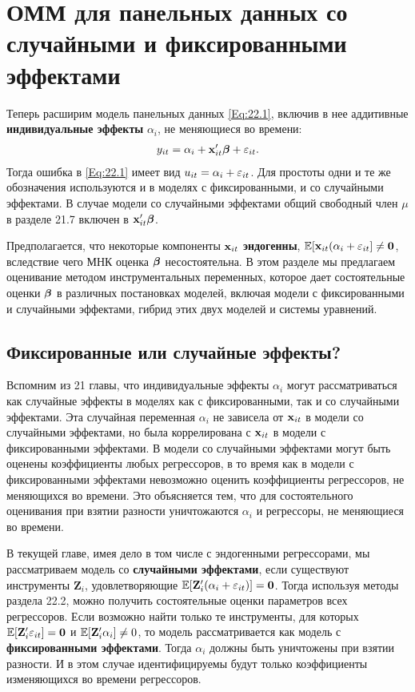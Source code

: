 \section{ОММ для панельных данных со случайными и фиксированными эффектами}

Теперь расширим модель панельных данных \ref{Eq:22.1}, включив в нее аддитивные \textbf{индивидуальные эффекты} $\alpha_i$, не меняющиеся во времени:
\begin{align}
y_{it}=\alpha_i+\mathbf{x}'_{it}\bm{\beta} + \varepsilon_{it}.
\label{Eq:22.23}
\end{align}
Тогда ошибка в \ref{Eq:22.1} имеет вид $u_{it}=\alpha_i +\varepsilon_{it}$. Для простоты одни и те же  обозначения используются и в моделях с фиксированными, и со случайными эффектами. В случае модели со случайными эффектами общий свободный член $\mu$ в разделе 21.7 включен в $\mathbf{x}'_{it} \bm{\beta}$.

Предполагается, что некоторые компоненты $\mathbf{x}_{it}$ \textbf{эндогенны}, $\mathbb{E}[\mathbf{x}_{it}(\alpha_i+\varepsilon_{it}] \neq \mathbf 0$, вследствие чего МНК оценка $\bm{\beta}$ несостоятельна. В этом разделе мы предлагаем оценивание методом инструментальных переменных, которое дает состоятельные оценки $\bm{\beta}$ в различных постановках моделей, включая модели с фиксированными и случайными эффектами, гибрид этих двух моделей и системы уравнений.

\subsection{Фиксированные или случайные эффекты?}

Вспомним из 21 главы, что индивидуальные эффекты $\alpha_i$ могут рассматриваться как случайные эффекты в моделях как с фиксированными, так и со случайными эффектами. Эта случайная переменная $\alpha_i$ не зависела от $\mathbf{x}_{it}$ в модели со случайными эффектами, но была коррелирована  с $\mathbf{x}_{it}$ в модели с фиксированными эффектами. В модели со случайными эффектами могут быть оценены коэффициенты любых регрессоров, в то время как в модели с фиксированными эффектами невозможно оценить коэффициенты регрессоров, не  меняющихся во времени. Это объясняется тем, что для состоятельного оценивания при взятии разности  уничтожаются $\alpha_i$ и регрессоры, не меняющиеся во времени.

В текущей главе, имея дело в том числе с эндогенными регрессорами, мы рассматриваем модель со \textbf{случайными эффектами}, если существуют инструменты $\mathbf Z_i$, удовлетворяющие $\mathbb{E}[\mathbf Z'_i(\alpha_i+\varepsilon_{it})]=\mathbf 0$. Тогда используя методы раздела 22.2, можно получить состоятельные оценки параметров всех регрессоров. Если возможно найти только те инструменты, для которых $\mathbb{E}[\mathbf Z'_i \varepsilon_{it}]=\mathbf 0$ и $\mathbb{E}[\mathbf Z'_i \alpha_i] \neq 0$, то модель рассматривается как модель с \textbf{фиксированными эффектами}. Тогда $\alpha_i$ 
должны быть уничтожены при взятии разности. И в этом случае идентифицируемы будут только коэффициенты изменяющихся во времени регрессоров.

